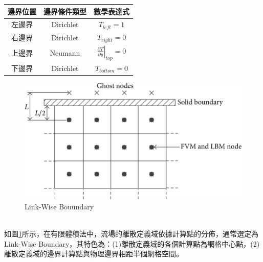 \documentclass[12pt]{article}
\begin{document}
\noindent
\begin{minipage}[t]{0.5\textwidth} %
   \begin{table}[H]
       \centering
       \renewcommand{\arraystretch}{1.8}
       \begin{tabular}{|c|c|c|}
           \hline
           \textbf{邊界位置} & \textbf{邊界條件類型} & \textbf{數學表達式} \\
            \hline
            左邊界 & Dirichlet & $T_{left} = 1$ \\
            \hline
            右邊界 & Dirichlet & $T_{right} = 0$ \\
            \hline
            上邊界 & Neumann & $\left.\frac{\partial T}{\partial y}\right|_{top}= 0$ \\
            \hline
            下邊界 & Dirichlet & $T_{bottom} = 0$ \\
            \hline
        \end{tabular}
        \label{tab:boundary}
    \end{table}
\end{minipage}
\hfill
\begin{minipage}[t]{0.5\textwidth}
    \begin{figure}[H]
        \centering
        \includegraphics[width=\textwidth]{11.png}
        \caption{Link-Wise Bouundary}
        \label{fig:Link-Wise}
    \end{figure}
\end{minipage}\\[2.5ex]
\noindent 如圖\ref{fig:Link-Wise}所示，在有限體積法中，流場的離散定義域依據計算點的分佈，通常選定為Link-Wise Boundary，其特色為：(1)離散定義域的各個計算點為網格中心點，(2)離散定義域的邊界計算點與物理邊界相距半個網格空間。\\
\end{document}
